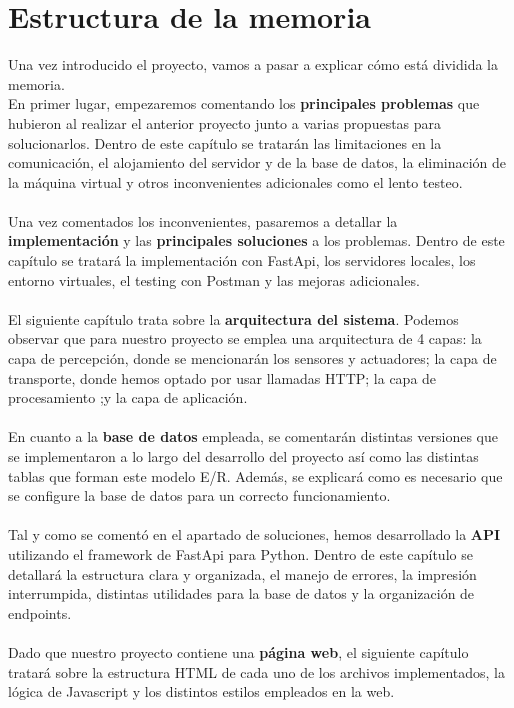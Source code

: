 \documentclass[12pt]{report}
\begin{document}
\section{Estructura de la memoria}
Una vez introducido el proyecto, vamos a pasar a explicar cómo está dividida la memoria.
\\
En primer lugar, empezaremos comentando los\textbf{ principales problemas} que hubieron al realizar el anterior proyecto junto a varias propuestas para solucionarlos. Dentro de este capítulo se tratarán las limitaciones en la comunicación, el alojamiento del servidor y de la base de datos, la eliminación de la máquina virtual y otros inconvenientes adicionales como el lento testeo.
\\\\
Una vez comentados los inconvenientes, pasaremos a detallar la \textbf{implementación} y las \textbf{principales soluciones} a los problemas. Dentro de este capítulo se tratará la implementación con FastApi, los servidores locales, los entorno virtuales, el testing con Postman y las mejoras adicionales.
\\\\
El siguiente capítulo trata sobre la \textbf{arquitectura del sistema}. Podemos observar que para nuestro proyecto se emplea una arquitectura de 4 capas: la capa de percepción, donde se mencionarán los sensores y actuadores; la capa de transporte, donde hemos optado por usar llamadas HTTP; la capa de procesamiento ;y la capa de aplicación.
\\\\
En cuanto a la \textbf{base de datos} empleada, se comentarán distintas versiones que se implementaron a lo largo del desarrollo del proyecto así como las distintas tablas que forman este modelo E/R. Además, se explicará como es necesario que se configure la base de datos para un correcto funcionamiento.
\\\\
Tal y como se comentó en el apartado de soluciones, hemos desarrollado la \textbf{API} utilizando el framework de FastApi para Python. Dentro de este capítulo se detallará la estructura clara y organizada, el manejo de errores, la impresión interrumpida, distintas utilidades para la base de datos y la organización de endpoints.
\\\\
Dado que nuestro proyecto contiene una \textbf{página web}, el siguiente capítulo tratará sobre la estructura HTML de cada uno de los archivos implementados, la lógica de Javascript y los distintos estilos empleados en la web.
\end{document}
